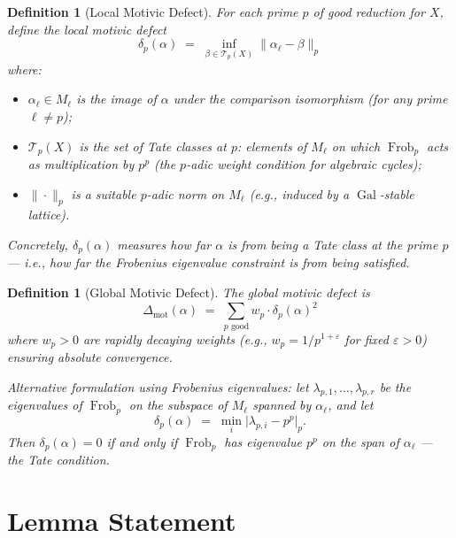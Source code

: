 \documentclass[11pt]{article}
\newtheorem{definition}[lemma]{Definition}
\theoremstyle{definition}
\DeclareMathOperator{\Gal}{Gal}
\DeclareMathOperator{\Frob}{Frob}
\begin{document}
\begin{definition}[Local Motivic Defect]
\label{def:local-defect}
For each prime $p$ of good reduction for $X$, define the \emph{local motivic defect}
\[
  \delta_p(\alpha) \;=\; \inf_{\beta \in \mathcal{T}_p(X)} \bigl\| \alpha_\ell - \beta \bigr\|_p
\]
where:
\begin{itemize}
  \item $\alpha_\ell \in M_\ell$ is the image of $\alpha$ under the comparison isomorphism
    (for any prime $\ell \neq p$);
  \item $\mathcal{T}_p(X)$ is the set of \emph{Tate classes} at $p$: elements of $M_\ell$
    on which $\Frob_p$ acts as multiplication by $p^p$ (the $p$-adic weight condition
    for algebraic cycles);
  \item $\| \cdot \|_p$ is a suitable $p$-adic norm on $M_\ell$
    (e.g., induced by a $\Gal$-stable lattice).
\end{itemize}

Concretely, $\delta_p(\alpha)$ measures how far $\alpha$ is from being a Tate class
at the prime $p$ --- i.e., how far the Frobenius eigenvalue constraint is from being satisfied.
\end{definition}

\begin{definition}[Global Motivic Defect]
\label{def:global-defect}
The \emph{global motivic defect} is
\[
  \Delta_{\mathrm{mot}}(\alpha) \;=\; \sum_{p \text{ good}} w_p \cdot \delta_p(\alpha)^2
\]
where $w_p > 0$ are rapidly decaying weights (e.g., $w_p = 1/p^{1+\varepsilon}$ for fixed $\varepsilon > 0$)
ensuring absolute convergence.

Alternative formulation using Frobenius eigenvalues:
let $\lambda_{p,1}, \ldots, \lambda_{p,r}$ be the eigenvalues of $\Frob_p$ on the subspace of $M_\ell$
spanned by $\alpha_\ell$, and let
\[
  \delta_p(\alpha) \;=\; \min_i \bigl| \lambda_{p,i} - p^p \bigr|_p.
\]
Then $\delta_p(\alpha) = 0$ if and only if $\Frob_p$ has eigenvalue $p^p$ on the span of $\alpha_\ell$
--- the Tate condition.
\end{definition}

\section{Lemma Statement}
\end{document}
